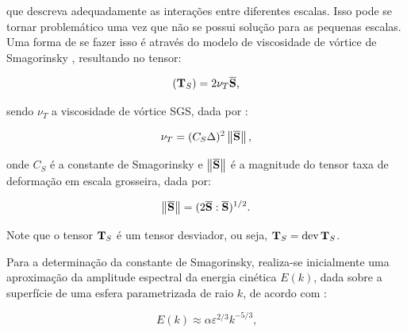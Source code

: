 \noindent que descreva adequadamente as interações entre diferentes escalas. Isso pode se tornar problemático uma vez que não se possui solução para as pequenas escalas. Uma forma de se fazer isso é através do modelo de viscosidade de vórtice de Smagorinsky \cite{smagorinsky1963general}, resultando no tensor:

\begin{equation}
    \left({\mathbf{T}_S}\right)=2\nu_T\overline{\mathbf{S}}\text{,}
\end{equation}

\noindent sendo $\nu_T$ a viscosidade de vórtice SGS, dada por \cite{germano1991dynamic,piomelli1999large,hughes2000large,bailly2015turbulence,katopodes2019free}:

\begin{equation}
    \nu_T=(C_S\Delta)^2\left\lVert{\overline{\mathbf{S}}}\right\lVert\text{,}
\end{equation}

\noindent onde $C_S$ é a constante de Smagorinsky e $\left\lVert{\overline{\mathbf{S}}}\right\lVert$ é a magnitude do tensor taxa de deformação em escala grosseira, dada por:

\begin{equation}
    \left\lVert{\overline{\mathbf{S}}}\right\lVert=(2\overline{\mathbf{S}}:\overline{\mathbf{S}})^{1/2}\text{.}
\end{equation}

Note que o tensor $\mathbf{T}_S$ é um tensor desviador, ou seja, $\mathbf{T}_S=\mathop{\mathrm{dev}}\nolimits{\mathbf{T}_S}$.

%

Para a determinação da constante de Smagorinsky, realiza-se inicialmente uma aproximação da amplitude espectral da energia cinética $E(k)$, dada sobre a superfície de uma esfera parametrizada de raio $k$, de acordo com \cite{hughes2000large}:

\begin{equation}
    E(k)\approx\alpha\varepsilon^{2/3}k^{-5/3}\text{,}\label{eq:Ek1}
\end{equation}

